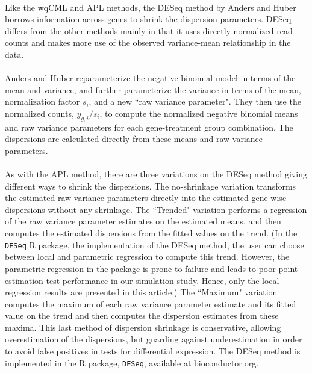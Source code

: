 \documentclass[10pt]{article}
\begin{document}
\paragraph{} \indent Like the wqCML and APL methods, the DESeq method by Anders and Huber \cite{deseq} borrows information across genes to shrink the dispersion parameters. DESeq differs from the other methods mainly in that it uses directly normalized read counts and makes more use of the observed variance-mean relationship in the data.

\paragraph{} \indent Anders and Huber \cite{deseq} reparameterize the negative binomial model in terms of the mean and variance, and further parameterize the variance in terms of the mean, normalization factor $s_i$, and a new ``raw variance parameter". They then use the normalized counts, $y_{g, i}/s_i$, to compute the normalized negative binomial means and raw variance parameters for each gene-treatment group combination. The dispersions are calculated directly from these means and raw variance parameters.

\paragraph{} \indent As with the APL method, there are three variations on the DESeq method giving different ways to shrink the dispersions. The no-shrinkage variation transforms the estimated raw variance parameters directly into the estimated gene-wise dispersions without any shrinkage. The ``Trended" variation performs a regression of the raw variance parameter estimates on the estimated means, and then computes the estimated dispersions from the fitted values on the trend. (In the {\tt DESeq} R package, the implementation of the DESeq method, the user can choose between local and parametric regression to compute this trend. However, the parametric regression in the package is prone to failure and leads to poor point estimation test performance in our simulation study. Hence, only the local regression results are presented in this article.) The ``Maximum" variation computes the maximum of each raw variance parameter estimate and its fitted value on the trend and then computes the dispersion estimates from these maxima. This last method of dispersion shrinkage is conservative, allowing overestimation of the dispersions, but guarding against underestimation in order to avoid false positives in tests for differential expression. The DESeq method is implemented in the R package, {\tt DESeq}, available at {bioconductor.org}.
\end{document}

